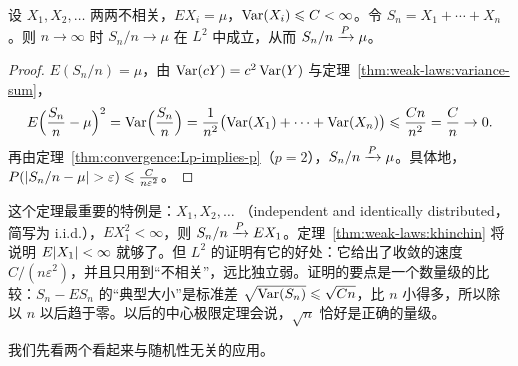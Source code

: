 \begin{theorem}[$L^2$ 弱大数定律]\label{thm:weak-laws:L2}
设 $X_1,X_2,\dots$ 两两不相关，$EX_i=\mu$，$\operatorname{Var}(X_i)\leqslant C<\infty$。令 $S_n=X_1+\cdots+X_n$。则 $n\to\infty$ 时 $S_n/n\to\mu$ 在 $L^2$ 中成立，从而 $S_n/n\xrightarrow{P}\mu$。
\end{theorem}
\begin{proof}
$E(S_n/n)=\mu$，由 $\operatorname{Var}(cY)=c^2\operatorname{Var}(Y)$ 与定理~\ref{thm:weak-laws:variance-sum}，
\[
E\Bigl(\frac{S_n}n-\mu\Bigr)^2=\operatorname{Var}\Bigl(\frac{S_n}n\Bigr)=\frac1{n^2}\bigl(\operatorname{Var}(X_1)+\cdots+\operatorname{Var}(X_n)\bigr)\leqslant\frac{Cn}{n^2}=\frac Cn\to0 .
\]
再由定理~\ref{thm:convergence:Lp-implies-p}（$p=2$），$S_n/n\xrightarrow{P}\mu$。具体地，$P(\lvert S_n/n-\mu\rvert>\varepsilon)\leqslant\frac C{n\varepsilon^2}$。
\end{proof}

\begin{remark}
这个定理最重要的特例是：$X_1,X_2,\dots$ （independent and identically distributed，简写为 i.i.d.），$EX_1^2<\infty$，则 $S_n/n\xrightarrow{P} EX_1$。定理~\ref{thm:weak-laws:khinchin} 将说明 $E\lvert X_1\rvert<\infty$ 就够了。但 $L^2$ 的证明有它的好处：它给出了收敛的速度 $C/(n\varepsilon^2)$，并且只用到“不相关”，远比独立弱。证明的要点是一个数量级的比较：$S_n-ES_n$ 的“典型大小”是标准差 $\sqrt{\operatorname{Var}(S_n)}\leqslant\sqrt{Cn}$，比 $n$ 小得多，所以除以 $n$ 以后趋于零。以后的中心极限定理会说，$\sqrt n$ 恰好是正确的量级。
\end{remark}

我们先看两个看起来与随机性无关的应用。

